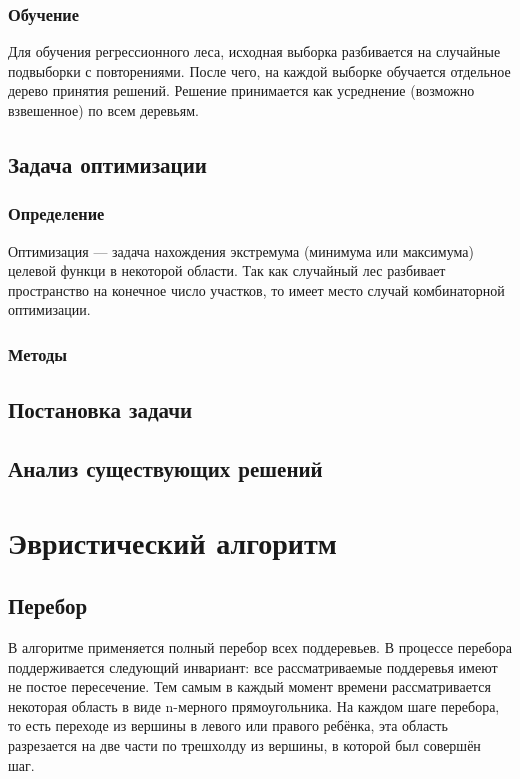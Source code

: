 \documentclass[pscyr,specification,annotation]{itmo-student-thesis}
\begin{document}
\subsection{Обучение}
Для обучения регрессионного леса, исходная выборка разбивается на случайные
подвыборки с повторениями. После чего, на каждой выборке обучается отдельное
дерево принятия решений. Решение принимается как усреднение (возможно
взвешенное) по всем деревьям.


\section{Задача оптимизации}
\subsection{Определение}
Оптимизация --- задача нахождения экстремума (минимума или максимума) целевой
функци в некоторой области. Так как случайный лес разбивает пространство на
конечное число участков, то имеет место случай комбинаторной оптимизации.

\subsection{Методы}

\section{Постановка задачи}

\section{Анализ существующих решений}

\chapter{Эвристический алгоритм}

\section{Перебор}
В алгоритме применяется полный перебор всех поддеревьев. В процессе перебора
поддерживается следующий инвариант: все рассматриваемые поддеревья имеют не
постое пересечение. Тем самым в каждый момент времени рассматривается некоторая
область в виде n-мерного прямоугольника. На каждом шаге перебора, то есть
переходе из вершины в левого или правого ребёнка, эта область разрезается на две
части по трешхолду из вершины, в которой был совершён шаг.
\end{document}
